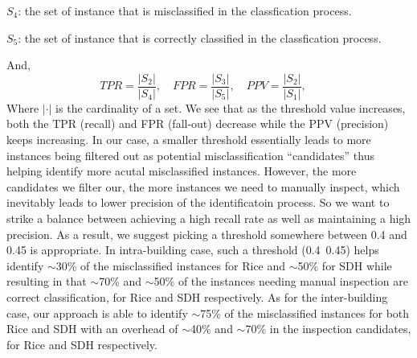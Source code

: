 $S_{4}$: the set of instance that is misclassified in the classfication process.

$S_{5}$: the set of instance that is correctly classified in the classfication process.

And, 
\begin{displaymath}
TPR = \frac{|S_{2}|}{|S_{4}|},\quad
FPR = \frac{|S_{3}|}{|S_{5}|},\quad
PPV = \frac{|S_{2}|}{|S_{1}|},\quad
\end{displaymath}
Where $|\cdot|$ is the cardinality of a set. We see that as the threshold value increases, both the TPR (recall) and FPR (fall-out) decrease while the PPV (precision) keeps increasing. In our case, a smaller threshold essentially leads to more instances being filtered out as potential misclassification ``candidates'' thus helping identify more acutal misclassified instances. However, the more candidates we filter our, the more instances we need to manually inspect,
which inevitably leads to lower precision of the identificatoin process. So we want to strike a balance between achieving a high recall rate as well as maintaining a high precision. As a result, we suggest picking a threshold somewhere between 0.4 and 0.45 is appropriate. In intra-building case, such a threshold (0.4~0.45) helps identify $\sim$30\% of the misclassified instances for Rice and $\sim$50\% for SDH while resulting in that $\sim$70\% and $\sim$50\% of the instances
needing manual inspection are correct classification, for Rice and SDH respectively. As for the inter-building case, our approach is able to identify $\sim$75\% of the misclassified instances for both Rice and SDH with an overhead of $\sim$40\% and $\sim$70\% in the inspection candidates, for Rice and SDH respectively.

